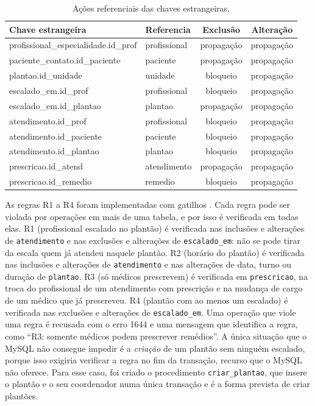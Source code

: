 \documentclass[10pt,a4paper]{article}
\begin{document}
\begin{table}[H]
\centering\footnotesize
\caption{Ações referenciais das chaves estrangeiras.}
\label{tab:fk}
\begin{tabular}{llcc}
\toprule
Chave estrangeira & Referencia & Exclusão & Alteração \\
\midrule
profissional\_especialidade.id\_prof & profissional & propagação & propagação \\
paciente\_contato.id\_paciente & paciente & propagação & propagação \\
plantao.id\_unidade & unidade & bloqueio & propagação \\
escalado\_em.id\_prof & profissional & bloqueio & propagação \\
escalado\_em.id\_plantao & plantao & propagação & propagação \\
atendimento.id\_prof & profissional & bloqueio & propagação \\
atendimento.id\_paciente & paciente & bloqueio & propagação \\
atendimento.id\_plantao & plantao & bloqueio & propagação \\
prescricao.id\_atend & atendimento & propagação & propagação \\
prescricao.id\_remedio & remedio & bloqueio & propagação \\
\bottomrule
\end{tabular}
\end{table}

As regras R1 a R4 foram implementadas com gatilhos \cite{mysql-trigger}. Cada regra pode ser violada por operações em mais de uma tabela, e por isso é verificada em todas elas. R1 (profissional escalado no plantão) é verificada nas inclusões e alterações de \texttt{atendimento} e nas exclusões e alterações de \texttt{escalado\_em}: não se pode tirar da escala quem já atendeu naquele plantão. R2 (horário do plantão) é verificada nas inclusões e alterações de \texttt{atendimento} e nas alterações de data, turno ou duração de \texttt{plantao}. R3 (só médicos prescrevem) é verificada em \texttt{prescricao}, na troca do profissional de um atendimento com prescrição e na mudança de cargo de um médico que já prescreveu. R4 (plantão com ao menos um escalado) é verificada nas exclusões e alterações de \texttt{escalado\_em}. Uma operação que viole uma regra é recusada com o erro 1644 e uma mensagem que identifica a regra, como ``R3: somente médicos podem prescrever remédios''. A única situação que o MySQL não consegue impedir é a \emph{criação} de um plantão sem ninguém escalado, porque isso exigiria verificar a regra no fim da transação, recurso que o MySQL não oferece. Para esse caso, foi criado o procedimento \texttt{criar\_plantao}, que insere o plantão e o seu coordenador numa única transação e é a forma prevista de criar plantões.
\end{document}
